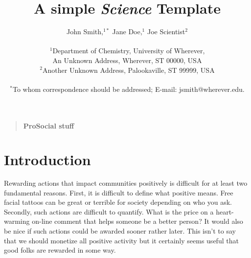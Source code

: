 \documentclass[12pt]{article}
\title{A simple {\it Science\/} Template}
\author
{John Smith,$^{1\ast}$ Jane Doe,$^{1}$ Joe Scientist$^{2}$\\
\\
\normalsize{$^{1}$Department of Chemistry, University of Wherever,}\\
\normalsize{An Unknown Address, Wherever, ST 00000, USA}\\
\normalsize{$^{2}$Another Unknown Address, Palookaville, ST 99999, USA}\\
\\
\normalsize{$^\ast$To whom correspondence should be addressed; E-mail:  jsmith@wherever.edu.}
}
\date{}
\newenvironment{sciabstract}{%
\begin{quote} \bf}
{\end{quote}}
\begin{document}
 


\baselineskip24pt


\maketitle 




\begin{sciabstract}
  ProSocial stuff
\end{sciabstract}


\section*{Introduction}

Rewarding actions that impact communities positively is difficult for at least two fundamental reasons. First, it is difficult to define what positive means. Free facial tattoos can be great or terrible for society depending on who you ask. Secondly, such actions are difficult to quantify. What is the price on a heart-warming on-line comment that helps someone be a better person? It would also be nice if such actions could be awarded sooner rather later. This isn't to say that we should monetize all positive activity but it certainly seems useful that good folks are rewarded in some way.
\end{document}
